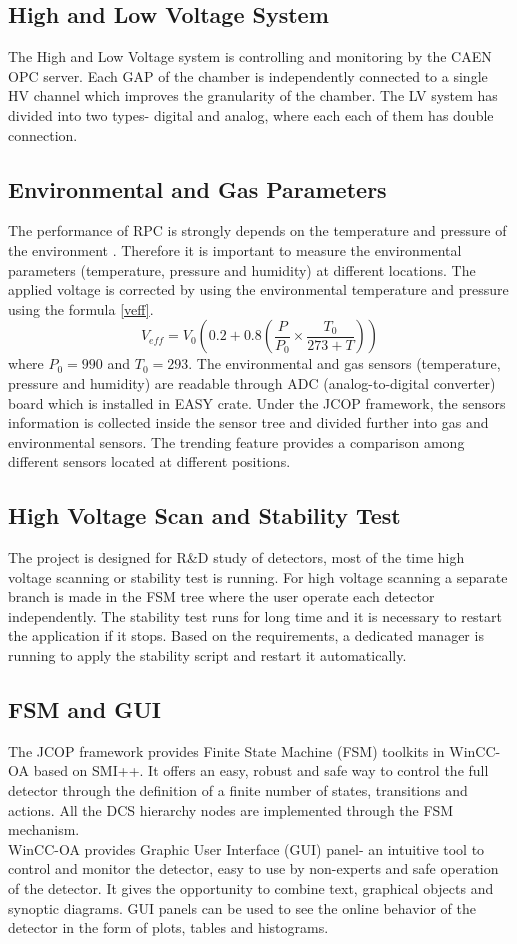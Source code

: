 \documentclass[a4paper,11pt]{article}
\begin{document}
 
\subsection{High and Low Voltage System}
The High and Low Voltage system is controlling and monitoring by the CAEN OPC server. Each GAP of the chamber is independently connected to a single HV channel which improves the granularity of the chamber. The LV system has divided into two types- digital and analog, where each each of them has double connection.  
\subsection{Environmental and Gas Parameters}
The performance of RPC is strongly depends on the temperature and pressure of the environment \cite{env-rpc}. Therefore it is important to measure the environmental parameters (temperature, pressure and humidity) at different locations. The applied voltage is corrected by using the environmental temperature and pressure using the formula \eqref{veff}.
\begin{equation*}\label{veff}
V_{eff} = V_{0} ( 0.2 + 0.8 (\frac{P}{P_{0}} \times \frac{T_{0}}{273+T}))
\end{equation*}
where $P_{0} = 990$ and $T_{0} = 293$.
The environmental and gas sensors (temperature, pressure and humidity) are readable through ADC (analog-to-digital converter) board which is installed in EASY crate. Under the JCOP framework, the sensors information is collected inside the sensor tree and divided further into gas and environmental sensors. The trending feature provides a comparison among different sensors located at different positions.

\subsection{High Voltage Scan and Stability Test}
The project is designed for R\&D study of detectors, most of the time high voltage scanning or stability test is running. For high voltage scanning a separate branch is made in the FSM tree where the user operate each detector independently. The stability test runs for long time and it is necessary to restart the application if it stops. Based on the requirements, a dedicated manager is running to apply the stability script and restart it automatically.    
\subsection{FSM and GUI} 
The JCOP framework provides Finite State Machine (FSM) toolkits in WinCC-OA based on SMI++. It offers an easy, robust and safe way to control the full detector through the definition of a finite number of states, transitions and actions. All the DCS hierarchy nodes are implemented through the FSM mechanism.\\
WinCC-OA provides Graphic User Interface (GUI) panel- an intuitive tool to control and monitor the detector, easy to use by non-experts and safe operation of the detector. It gives the opportunity to combine text, graphical objects and synoptic diagrams. GUI panels can be used to see the online behavior of the detector in the form of plots, tables and histograms. 
\end{document}
